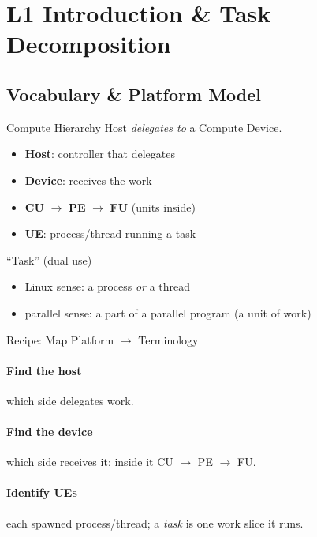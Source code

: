 \section{L1 Introduction \& Task Decomposition}

\subsection{Vocabulary \& Platform Model}


\begin{definition}{Compute Hierarchy}
    Host \emph{delegates to} a Compute Device.
    \begin{itemize}
        \item \textbf{Host}: controller that delegates
        \item \textbf{Device}: receives the work
        \item \textbf{CU} $\to$ \textbf{PE} $\to$ \textbf{FU} (units inside)
        \item \textbf{UE}: process/thread running a task
    \end{itemize}
\end{definition}

\begin{definition}{``Task'' (dual use)}
    \begin{itemize}
        \item Linux sense: a process \emph{or} a thread
        \item parallel sense: a part of a parallel program (a unit of work)
    \end{itemize}
\end{definition}



\begin{KR}{Recipe: Map Platform $\to$ Terminology}
    \paragraph{Find the host} which side delegates work.
    \paragraph{Find the device} which side receives it; inside it CU $\to$ PE $\to$ FU.
    \paragraph{Identify UEs} each spawned process/thread; a \emph{task} is one work slice it runs.
\end{KR}

